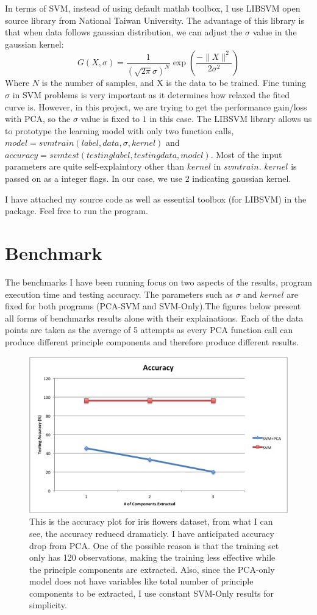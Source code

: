 \documentclass[11pt]{article}
\begin{document}
In terms of SVM, instead of using default matlab toolbox, I use LIBSVM open source library from National Taiwan University. The advantage of this library is that when data follows gaussian distribution, we can adjust the $\sigma$ value in the gaussian kernel:
\[G (X, \sigma) = \frac{1}{(\sqrt{2\pi}\sigma)^N}\exp(\frac{-\|X\| ^2}{2\sigma ^2})\]
Where $N$ is the number of samples, and X is the data to be trained. Fine tuning $\sigma$ in SVM problems is very important as it determines how relaxed the fited curve is. However, in this project, we are trying to get the performance gain/loss with PCA, so the $\sigma$ value is fixed to $1$ in this case. The LIBSVM library allows us to prototype the learning model with only two function calls, $model = svmtrain(label, data, \sigma, kernel)$ and $accuracy = svmtest(testing label, testing data, model)$. Most of the input parameters are quite self-explaintory other than $kernel$ in $svmtrain$. $kernel$ is passed on as a integer flags. In our case, we use $2$ indicating gaussian kernel.\par
I have attached my source code as well as essential toolbox (for LIBSVM) in the package. Feel free to run the program.   

\section{Benchmark}
The benchmarks I have been running focus on two aspects of the results, program execution time and testing accuracy. The parameters such as $\sigma$ and $kernel$ are fixed for both programs (PCA-SVM and SVM-Only).The figures below present all forms of benchmarks results alone with their explainations. Each of the data points are taken as the average of 5 attempts as every PCA function call can produce different principle components and therefore produce different results.

\begin{figure}[H]
\centering
\includegraphics[width=120mm]{iris_accuracy.jpg}
\caption{ This is the accuracy plot for iris flowers dataset, from what I can see, the accuracy reduecd dramaticly. I have anticipated accuracy drop from PCA. One of the possible reason is that the training set only has 120 observations, making the training less effective while the principle components are extracted. Also, since the PCA-only model does not have variables like total number of principle components to be extracted, I use constant SVM-Only results for simplicity.\label{problem1Pic2}}
\end{figure}
\end{document}
